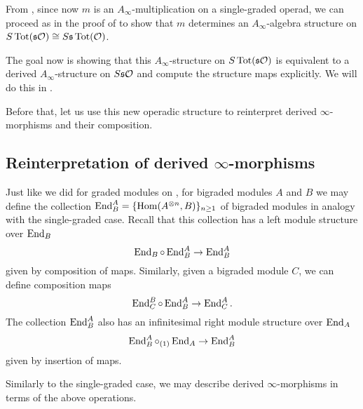 \documentclass[Thesis.tex]{subfiles}
\begin{document}
From , since now $m$ is an $A_\infty$-multiplication on a single-graded operad, we can proceed as in the proof of  to show that $m$ determines an $A_\infty$-algebra structure on $S\operatorname{Tot}(\mathfrak{s}{\mathcal O})\cong S\mathfrak{s} \operatorname{Tot}({\mathcal O})$. 

The goal now is showing that this $A_\infty$-structure on $S\operatorname{Tot}(\mathfrak{s}{\mathcal O})$ is equivalent to a derived $A_\infty$-structure on $S\mathfrak{s} {\mathcal O}$ and compute the structure maps explicitly. We will do this in . 

Before that, let us use this new operadic structure to reinterpret derived $\infty$-morphisms and their composition.

\subsection{Reinterpretation of derived $\infty$-morphisms}

Just like we did for graded modules on , for bigraded modules $A$ and $B$ we may define the collection $\operatorname{End}^A_B=\{\operatorname{Hom}(A^{\otimes n}, B)\}_{n\geq 1}$ of bigraded modules in analogy with the single-graded case. Recall that this collection has a left module structure over $\operatorname{End}_B$
\[\operatorname{End}_B\circ \operatorname{End}^A_B\to \operatorname{End}^A_B\]
given by composition of maps. Similarly, given a bigraded module $C$, we can define composition maps
\[\operatorname{End}^B_C\circ \operatorname{End}^A_B\to \operatorname{End}^A_C.\]
The collection $\operatorname{End}^A_B$ also has an infinitesimal right module structure over $\operatorname{End}_A$
\[\operatorname{End}^A_B\circ_{(1)}\operatorname{End}_A\to \operatorname{End}^A_B\]
given by insertion of maps.

Similarly to the single-graded case, we may describe derived $\infty$-morphisms in terms of the above operations.
\end{document}
